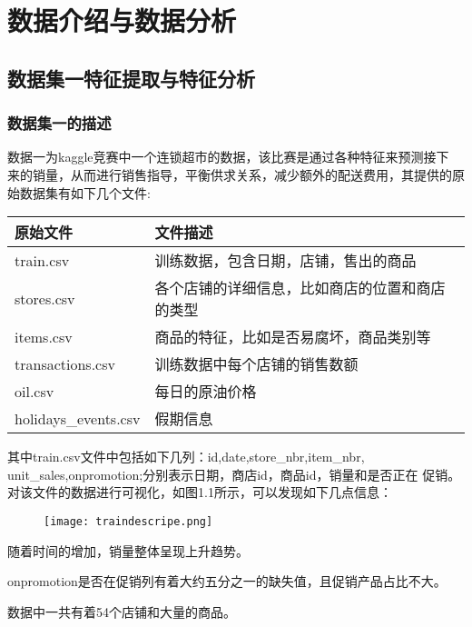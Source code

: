 ﻿%

\chapter{数据介绍与数据分析}
\label{chap01}

\section{数据集一特征提取与特征分析}
\subsection{数据集一的描述}
数据一为kaggle竞赛中一个连锁超市的数据，该比赛是通过各种特征来预测接下
来的销量，从而进行销售指导，平衡供求关系，减少额外的配送费用，其提供的原
始数据集有如下几个文件:
\begin{table}[htbp]  
  \centering
  \vspace{0.2cm}
  \zhongwu
  \begin{tabularx}{0.8\textwidth{}}{lX}
    \toprule
    原始文件  				& 文件描述  \\
    \midrule
    train.csv 				& 训练数据，包含日期，店铺，售出的商品 \\
    stores.csv   			& 各个店铺的详细信息，比如商店的位置和商店的类型 \\
    items.csv   			& 商品的特征，比如是否易腐坏，商品类别等 \\
    transactions.csv    	& 训练数据中每个店铺的销售数额  \\ 
    oil.csv 				& 每日的原油价格  \\ 
    holidays\_events.csv 	& 假期信息  \\ 
    \bottomrule
  \end{tabularx}
\end{table}

其中train.csv文件中包括如下几列：id,date,store\_nbr,item\_nbr,
unit\_sales,onpromotion;分别表示日期，商店id，商品id，销量和是否正在
促销。对该文件的数据进行可视化，如图1.1所示，可以发现如下几点信息：
\begin{figure}[htbp]
  \centering
  \texttt{[image: traindescripe.png]}
\end{figure}

\begin{asparaenum}
\item 随着时间的增加，销量整体呈现上升趋势。 
\item onpromotion是否在促销列有着大约五分之一的缺失值，且促销产品占比不大。
\item 数据中一共有着54个店铺和大量的商品。
\end{asparaenum}

